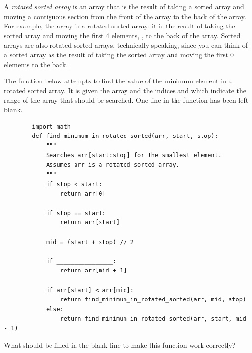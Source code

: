 \Needspace{7.5in}
\begin{prob}
    A \emph{rotated sorted array} is an array that is the result of taking a sorted array
    and moving a contiguous section from the front of the array to the back of the array.
    For example, the array \python{[5, 6, 7, 1, 2, 3, 4]} is a rotated sorted array: it
    is the result of taking the sorted array \python{[1, 2, 3, 4, 5, 6, 7]} and moving
    the first 4 elements, \python{[1, 2, 3, 4]}, to the back of the array. Sorted
    arrays are also rotated sorted arrays, technically speaking, since you can
    think of a sorted array as the result of taking the sorted array and moving
    the first 0 elements to the back.

    The function below attempts to find the value of the minimum element in a
    rotated sorted array. It is given the array  and the indices
     and  which indicate the range of the array that
    should be searched. One line in the function has been left blank.


    \begin{verbatim}
        import math
        def find_minimum_in_rotated_sorted(arr, start, stop):
            """
            Searches arr[start:stop] for the smallest element.
            Assumes arr is a rotated sorted array.
            """
            if stop < start:
                return arr[0]

            if stop == start:
                return arr[start]

            mid = (start + stop) // 2

            if ________________:
                return arr[mid + 1]

            if arr[start] < arr[mid]:
                return find_minimum_in_rotated_sorted(arr, mid, stop)
            else:
                return find_minimum_in_rotated_sorted(arr, start, mid - 1)
    \end{verbatim}

    What should be filled in the blank line to make this function work correctly?

    \begin{choices}
        \choice {}
        \choice {}
        \choice {}
        \choice {}
        \correctchoice {}
        \choice {}
    \end{choices}

\end{prob}
